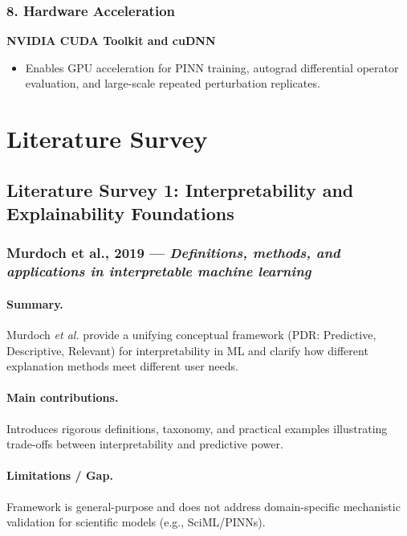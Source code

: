 \documentclass[12pt,singleside,a4paper]{article}
\begin{document}
\subsubsection{8. Hardware Acceleration}

\textbf{NVIDIA CUDA Toolkit and cuDNN}
\begin{itemize}
    \item Enables GPU acceleration for PINN training, autograd differential operator evaluation, and large-scale repeated perturbation replicates.
\end{itemize}


\section{Literature Survey}


\subsection{Literature Survey 1: Interpretability and Explainability Foundations}

\subsubsection{Murdoch et al., 2019 — \textit{Definitions, methods, and applications in interpretable machine learning}}
\paragraph{Summary.}
Murdoch \textit{et al.} provide a unifying conceptual framework (PDR: Predictive, Descriptive, Relevant) for interpretability in ML and clarify how different explanation methods meet different user needs.  
\paragraph{Main contributions.}
Introduces rigorous definitions, taxonomy, and practical examples illustrating trade-offs between interpretability and predictive power.  
\paragraph{Limitations / Gap.}
Framework is general-purpose and does not address domain-specific mechanistic validation for scientific models (e.g., SciML/PINNs).  
\end{document}
